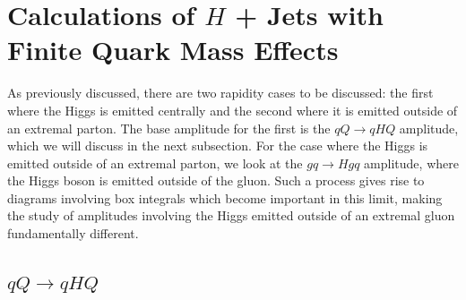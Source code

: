 \section{Calculations of $H$ + Jets with Finite Quark Mass Effects}

As previously discussed, there are two rapidity cases to be discussed: the first where the Higgs is emitted centrally and the second where it is emitted outside of an extremal parton. The base amplitude for the first is the $qQ \to qHQ$ amplitude, which we will discuss in the next subsection. For the case where the Higgs is emitted outside of an extremal parton, we look at the $gq \to Hgq$ amplitude, where the Higgs boson is emitted outside of the gluon. Such a process gives rise to diagrams involving box integrals which become important in this limit, making the study of amplitudes involving the Higgs emitted outside of an extremal gluon fundamentally different. 

\subsection{$qQ \to qHQ$}

